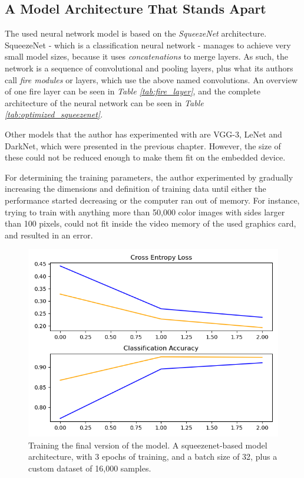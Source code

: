 \subsection{A Model Architecture That Stands Apart}
The used neural network model is based on the \textit{SqueezeNet} architecture. SqueezeNet - which is a classification neural network - manages to achieve very small model sizes, because it uses \textit{concatenations} to merge layers. As such, the network is a sequence of convolutional and pooling layers, plus what its authors call \textit{fire modules} or layers, which use the above named convolutions. An overview of one fire layer can be seen in \textit{Table \ref{tab:fire_layer}}, and the complete architecture of the neural network can be seen in \textit{Table \ref{tab:optimized_squeezenet}}. \par

Other models that the author has experimented with are VGG-3, LeNet and DarkNet, which were presented in the previous chapter. However, the size of these could not be reduced enough to make them fit on the embedded device. \par 
For determining the training parameters, the author experimented by gradually increasing the dimensions and definition of training data until either the performance started decreasing or the computer ran out of memory. For instance, trying to train with anything more than 50,000 color images with sides larger than 100 pixels, could not fit inside the video memory of the used graphics card, and resulted in an error.
\begin{figure}
    \centering
    \includegraphics[height = 10 cm]{images/squeezenet_3epochs.png}
    \caption{Training the final version of the model. A squeezenet-based model architecture, with 3 epochs of training, and a batch size of 32, plus a custom dataset of 16,000 samples.}
    \label{fig:squeezenet_final_3_epochs}
\end{figure}

